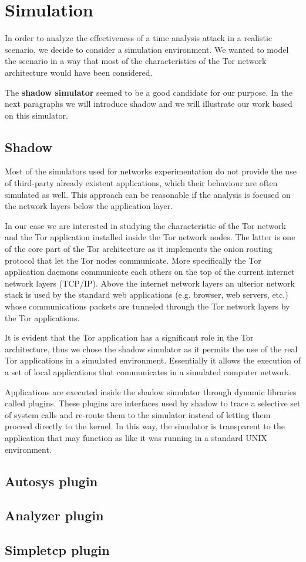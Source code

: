 \section{Simulation}
\label{sec:simulation}
In order to analyze the effectiveness of a time analysis attack in a
realistic scenario, we decide to consider a simulation environment.
We wanted to model the scenario in a way that most of the
characteristics of the Tor network architecture would have been
considered.

The \textbf{shadow simulator}\cite{shadowoverview} seemed to be a good candidate for our purpose. In
the next paragraphs we will introduce shadow and we will illustrate our
work based on this simulator.
 
\subsection{Shadow}
Most of the simulators used for networks experimentation do not provide
the use of third-party already existent applications, which their
behaviour are often simulated as well. 
This approach can be reasonable if the analysis is focused on the 
network layers below the application layer. 

In our case we are interested in studying the characteristic of the Tor
network and the Tor application installed inside the Tor network nodes.
The latter is one of the core part of the Tor architecture as it implements the
onion routing protocol that let the Tor nodes communicate. More
specifically the Tor application daemons communicate each others on the 
top of the current internet network layers (TCP/IP). Above the internet
network layers an ulterior network stack is used by the standard web applications 
(e.g. browser, web servers, etc.) whose communications packets are
tunneled through the Tor network layers by the Tor applications.

It is evident that the Tor application has a significant role in
the Tor architecture, thus we chose the shadow simulator as it permits
the use of the real Tor applications in a simulated environment.
Essentially it allows the execution of a set of local applications that
communicates in a simulated computer network.

Applications are executed inside the shadow simulator through 
dynamic libraries called plugins. 
These plugins are interfaces used by shadow to trace a
selective set of system calls and re-route them to the simulator instead
of letting them proceed directly to the kernel. 
In this way, the simulator is transparent to the application
that may function as like it was running in a standard UNIX environment. 


\subsection{Autosys plugin}
\subsection{Analyzer plugin}
\subsection{Simpletcp plugin}
